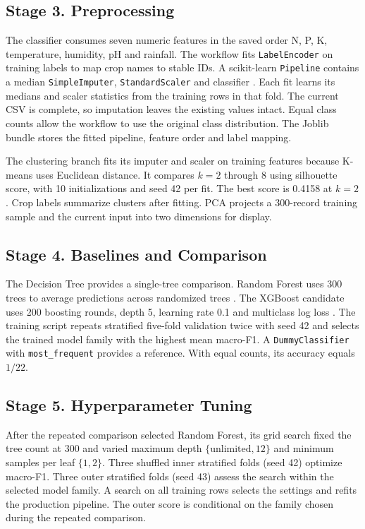 \documentclass[conference]{IEEEtran}
\begin{document}
\subsection{Stage 3. Preprocessing}
The classifier consumes seven numeric features in the saved order N, P, K, temperature, humidity, pH and rainfall. The workflow fits \texttt{LabelEncoder} on training labels to map crop names to stable IDs. A scikit-learn \texttt{Pipeline} contains a median \texttt{SimpleImputer}, \texttt{StandardScaler} and classifier \cite{sklearn}. Each fit learns its medians and scaler statistics from the training rows in that fold. The current CSV is complete, so imputation leaves the existing values intact. Equal class counts allow the workflow to use the original class distribution. The Joblib bundle stores the fitted pipeline, feature order and label mapping.

The clustering branch fits its imputer and scaler on training features because K-means uses Euclidean distance. It compares $k=2$ through $8$ using silhouette score, with 10 initializations and seed 42 per fit. The best score is 0.4158 at $k=2$. Crop labels summarize clusters after fitting. PCA projects a 300-record training sample and the current input into two dimensions for display.

\subsection{Stage 4. Baselines and Comparison}
The Decision Tree provides a single-tree comparison. Random Forest uses 300 trees to average predictions across randomized trees \cite{breiman}. The XGBoost candidate uses 200 boosting rounds, depth 5, learning rate 0.1 and multiclass log loss \cite{xgboost}. The training script repeats stratified five-fold validation twice with seed 42 and selects the trained model family with the highest mean macro-F1. A \texttt{DummyClassifier} with \texttt{most\_frequent} provides a reference. With equal counts, its accuracy equals $1/22$.

\subsection{Stage 5. Hyperparameter Tuning}
After the repeated comparison selected Random Forest, its grid search fixed the tree count at 300 and varied maximum depth $\{\text{unlimited},12\}$ and minimum samples per leaf $\{1,2\}$. Three shuffled inner stratified folds (seed 42) optimize macro-F1. Three outer stratified folds (seed 43) assess the search within the selected model family. A search on all training rows selects the settings and refits the production pipeline. The outer score is conditional on the family chosen during the repeated comparison.
\end{document}
